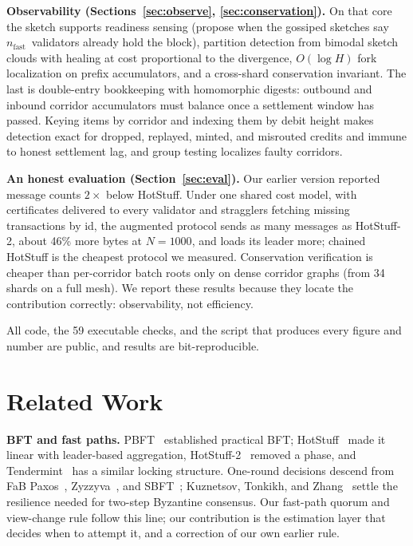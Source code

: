 \documentclass[journal]{IEEEtran}
\newcommand{\nf}{\ensuremath{n_{\mathrm{fast}}}}
\begin{document}
\textbf{Observability (Sections~\ref{sec:observe}, \ref{sec:conservation}).}
On that core the sketch supports readiness sensing (propose when the
gossiped sketches say \nf\ validators already hold the block), partition
detection from bimodal sketch clouds with healing at cost proportional to
the divergence, $O(\log H)$ fork localization on prefix accumulators, and
a cross-shard conservation invariant. The last is double-entry
bookkeeping with homomorphic digests: outbound and inbound corridor
accumulators must balance once a settlement window has passed. Keying
items by corridor and indexing them by debit height makes detection exact
for dropped, replayed, minted, and misrouted credits and immune to honest
settlement lag, and group testing localizes faulty corridors.

\textbf{An honest evaluation (Section~\ref{sec:eval}).} Our earlier
version reported message counts $2\times$ below HotStuff. Under one
shared cost model, with certificates delivered to every validator and
stragglers fetching missing transactions by id, the augmented protocol
sends as many messages as HotStuff-2, about 46\% more bytes at
$N = 1000$, and loads its leader more; chained HotStuff is the cheapest
protocol we measured. Conservation verification is cheaper than
per-corridor batch roots only on dense corridor graphs (from 34 shards on
a full mesh). We report these results because they locate the
contribution correctly: observability, not efficiency.

All code, the 59 executable checks, and the script that produces every
figure and number are public, and results are bit-reproducible.

\section{Related Work}
\label{sec:related}

\textbf{BFT and fast paths.} PBFT~\cite{castro1999pbft} established
practical BFT; HotStuff~\cite{yin2019hotstuff} made it linear with
leader-based aggregation, HotStuff-2~\cite{malkhi2023hotstuff2} removed a
phase, and Tendermint~\cite{buchman2016tendermint} has a similar locking
structure. One-round decisions descend from FaB
Paxos~\cite{martin2006fab}, Zyzzyva~\cite{kotla2007zyzzyva}, and
SBFT~\cite{gueta2019sbft}; Kuznetsov, Tonkikh, and
Zhang~\cite{kuznetsov2021fast} settle the resilience needed for
two-step Byzantine consensus. Our fast-path quorum and view-change rule
follow this line; our contribution is the estimation layer that decides
when to attempt it, and a correction of our own earlier rule.
\end{document}
